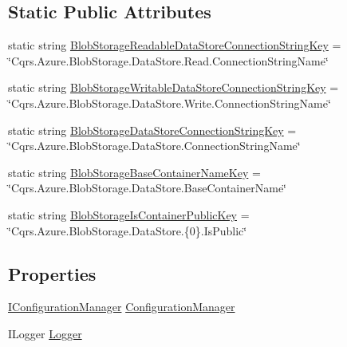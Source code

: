 \subsection*{Static Public Attributes}
\begin{DoxyCompactItemize}
\item 
static string \hyperlink{classCqrs_1_1Azure_1_1BlobStorage_1_1DataStores_1_1BlobStorageDataStoreConnectionStringFactory_a2f05e93dc8fced32c8526f87d02ee714_a2f05e93dc8fced32c8526f87d02ee714}{Blob\+Storage\+Readable\+Data\+Store\+Connection\+String\+Key} = \char`\"{}Cqrs.\+Azure.\+Blob\+Storage.\+Data\+Store.\+Read.\+Connection\+String\+Name\char`\"{}
\item 
static string \hyperlink{classCqrs_1_1Azure_1_1BlobStorage_1_1DataStores_1_1BlobStorageDataStoreConnectionStringFactory_ac1612324a23917f112006ad175d16711_ac1612324a23917f112006ad175d16711}{Blob\+Storage\+Writable\+Data\+Store\+Connection\+String\+Key} = \char`\"{}Cqrs.\+Azure.\+Blob\+Storage.\+Data\+Store.\+Write.\+Connection\+String\+Name\char`\"{}
\item 
static string \hyperlink{classCqrs_1_1Azure_1_1BlobStorage_1_1DataStores_1_1BlobStorageDataStoreConnectionStringFactory_ade860ef3ef2a7b09b90bd2188e4fcf31_ade860ef3ef2a7b09b90bd2188e4fcf31}{Blob\+Storage\+Data\+Store\+Connection\+String\+Key} = \char`\"{}Cqrs.\+Azure.\+Blob\+Storage.\+Data\+Store.\+Connection\+String\+Name\char`\"{}
\item 
static string \hyperlink{classCqrs_1_1Azure_1_1BlobStorage_1_1DataStores_1_1BlobStorageDataStoreConnectionStringFactory_a591fca7ea03045cc3c9e23a8f807d2d6_a591fca7ea03045cc3c9e23a8f807d2d6}{Blob\+Storage\+Base\+Container\+Name\+Key} = \char`\"{}Cqrs.\+Azure.\+Blob\+Storage.\+Data\+Store.\+Base\+Container\+Name\char`\"{}
\item 
static string \hyperlink{classCqrs_1_1Azure_1_1BlobStorage_1_1DataStores_1_1BlobStorageDataStoreConnectionStringFactory_ab94cd062689d85c041476e67b57f4d7f_ab94cd062689d85c041476e67b57f4d7f}{Blob\+Storage\+Is\+Container\+Public\+Key} = \char`\"{}Cqrs.\+Azure.\+Blob\+Storage.\+Data\+Store.\{0\}.Is\+Public\char`\"{}
\end{DoxyCompactItemize}
\subsection*{Properties}
\begin{DoxyCompactItemize}
\item 
\hyperlink{interfaceCqrs_1_1Configuration_1_1IConfigurationManager}{I\+Configuration\+Manager} \hyperlink{classCqrs_1_1Azure_1_1BlobStorage_1_1DataStores_1_1BlobStorageDataStoreConnectionStringFactory_a302ecb39a13da3a3c3ac183a480cb606_a302ecb39a13da3a3c3ac183a480cb606}{Configuration\+Manager}
\item 
I\+Logger \hyperlink{classCqrs_1_1Azure_1_1BlobStorage_1_1DataStores_1_1BlobStorageDataStoreConnectionStringFactory_a4a678d2419de2027e835d8e4f106134f_a4a678d2419de2027e835d8e4f106134f}{Logger}
\end{DoxyCompactItemize}


